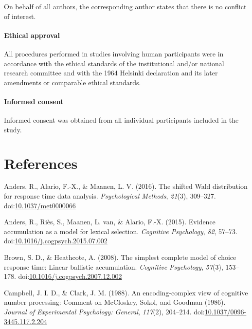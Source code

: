 \documentclass[english,man]{apa6}
\newcounter{author}
\theoremstyle{definition}
\theoremstyle{definition}
\theoremstyle{definition}
\theoremstyle{remark}
\begin{document}
On behalf of all authors, the corresponding author states that there is
no conflict of interest.

\paragraph{Ethical approval}\label{ethical-approval}

All procedures performed in studies involving human participants were in
accordance with the ethical standards of the institutional and/or
national research committee and with the 1964 Helsinki declaration and
its later amendments or comparable ethical standards.

\paragraph{Informed consent}\label{informed-consent}

Informed consent was obtained from all individual participants included
in the study.

\newpage

\section{References}\label{references}

\setlength{\parindent}{-0.5in} \setlength{\leftskip}{0.5in}

\hypertarget{refs}{}
\hypertarget{ref-anders2016}{}
Anders, R., Alario, F.-X., \& Maanen, L. V. (2016). The shifted Wald
distribution for response time data analysis. \emph{Psychological
Methods}, \emph{21}(3), 309--327.
doi:\href{https://doi.org/10.1037/met0000066}{10.1037/met0000066}

\hypertarget{ref-anders2015}{}
Anders, R., Riès, S., Maanen, L. van, \& Alario, F.-X. (2015). Evidence
accumulation as a model for lexical selection. \emph{Cognitive
Psychology}, \emph{82}, 57--73.
doi:\href{https://doi.org/10.1016/j.cogpsych.2015.07.002}{10.1016/j.cogpsych.2015.07.002}

\hypertarget{ref-brown2008}{}
Brown, S. D., \& Heathcote, A. (2008). The simplest complete model of
choice response time: Linear ballistic accumulation. \emph{Cognitive
Psychology}, \emph{57}(3), 153--178.
doi:\href{https://doi.org/10.1016/j.cogpsych.2007.12.002}{10.1016/j.cogpsych.2007.12.002}

\hypertarget{ref-campbell1988}{}
Campbell, J. I. D., \& Clark, J. M. (1988). An encoding-complex view of
cognitive number processing: Comment on McCloskey, Sokol, and Goodman
(1986). \emph{Journal of Experimental Psychology: General},
\emph{117}(2), 204--214.
doi:\href{https://doi.org/10.1037/0096-3445.117.2.204}{10.1037/0096-3445.117.2.204}
\end{document}
